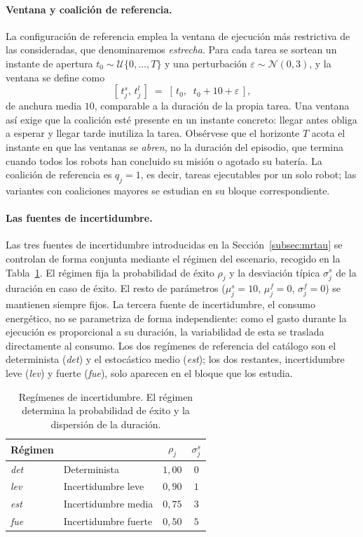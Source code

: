 \paragraph{Ventana y coalición de referencia.} La configuración de referencia emplea la ventana de ejecución más restrictiva de las consideradas, que denominaremos \emph{estrecha}. Para cada tarea se sortean un instante de apertura $t_0 \sim \mathcal{U}\{0,\dots,T\}$ y una perturbación $\varepsilon \sim \mathcal{N}(0,3)$, y la ventana se define como
\begin{equation} \label{eq:ventana-ref}
    [\,t_j^{s},\,t_j^{l}\,] \;=\; [\,t_0,\;\; t_0 + 10 + \varepsilon\,],
\end{equation}
de anchura media $10$, comparable a la duración de la propia tarea. Una ventana así exige que la coalición esté presente en un instante concreto: llegar antes obliga a esperar y llegar tarde inutiliza la tarea. Obsérvese que el horizonte $T$ acota el instante en que las ventanas se \emph{abren}, no la duración del episodio, que termina cuando todos los robots han concluido su misión o agotado su batería. La coalición de referencia es $q_j=1$, es decir, tareas ejecutables por un solo robot; las variantes con coaliciones mayores se estudian en su bloque correspondiente.

\paragraph{Las fuentes de incertidumbre.} Las tres fuentes de incertidumbre introducidas en la Sección~\ref{subsec:mrtau} se controlan de forma conjunta mediante el régimen del escenario, recogido en la Tabla~\ref{tab:regimenes}. El régimen fija la probabilidad de éxito $\rho_j$ y la desviación típica $\sigma_j^{s}$ de la duración en caso de éxito. El resto de parámetros ($\mu_j^s = 10$, $\mu_j^f=0$, $\sigma_j^f=0$) se mantienen siempre fijos. La tercera fuente de incertidumbre, el consumo energético, no se parametriza de forma independiente: como el gasto durante la ejecución es proporcional a su duración, la variabilidad de esta se traslada directamente al consumo. Los dos regímenes de referencia del catálogo son el determinista (\emph{det}) y el estocástico medio (\emph{est}); los dos restantes, incertidumbre leve (\emph{lev}) y fuerte (\emph{fue}), solo aparecen en el bloque que los estudia.

\begin{table}[t]
\centering
\caption{Regímenes de incertidumbre. El régimen determina la probabilidad de éxito y la dispersión de la duración.}
\label{tab:regimenes}
\begin{tabular}{llcc}
\hline
\textbf{Régimen} & & $\rho_j$ & $\sigma_j^{s}$ \\
\hline
\textit{det} & Determinista        & $1{,}00$ & $0$  \\
\textit{lev} & Incertidumbre leve  & $0{,}90$ & $1$  \\
\textit{est} & Incertidumbre media & $0{,}75$ & $3$ \\
\textit{fue} & Incertidumbre fuerte& $0{,}50$ & $5$ \\
\hline
\end{tabular}
\end{table}

